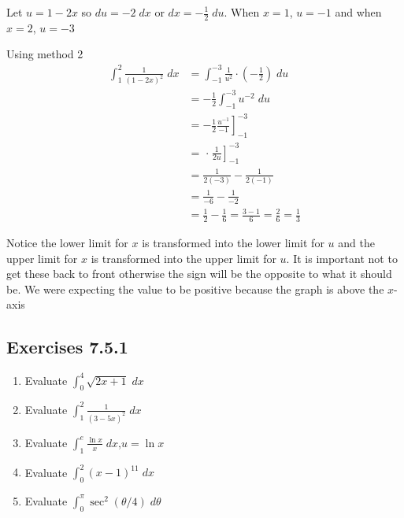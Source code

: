 Let $u =1 -2 x$ so $d u = -2\; d x$ or $d x = -\frac{1}{2}\; d u$. When $x =1$, $u = -1$ and when $x =2$, $u = -3$ 

Using method 2
\begin{align*}\int _{1}^{2}\frac{1}{\left (1 -2 x\right )^{2}}\; d x &  = \int _{ -1}^{ -3}\frac{1}{u^{2}} \cdot \left ( -\frac{1}{2}\right )\; d u \\
 &  =  -\frac{1}{2} \int _{ -1}^{ -3}u^{ -2}\; d u \\
 &  = \left . -\frac{1}{2} \frac{u^{ -1}}{ -1}\right ]_{ -1}^{ -3} \\
 &  = \genfrac{.}{]}{}{}{1}{2 u}_{ -1}^{ -3} \\
 &  = \frac{1}{2 \left ( -3\right )} -\frac{1}{2 \left ( -1\right )} \\
 &  = \frac{1}{ -6} -\frac{1}{ -2} \\
 &  = \frac{1}{2} -\frac{1}{6} =\frac{3 -1}{6} =\frac{2}{6} =\frac{1}{3}\end{align*}

Notice the lower limit for $x$ is transformed into the lower limit for $u$ and the upper limit for $x$ is transformed into the upper limit for $u$. It is important not to get these back to front otherwise the sign will be the opposite
to what it should be. We were expecting the value to be positive because the graph is above the $x$-axis 

\subsection{Exercises 7.5.1}
\begin{enumerate}
\item Evaluate $\int _{0}^{4}\sqrt{2 x +1}\; d x$ 

\item Evaluate $\int _{1}^{2}\frac{1}{\left (3 -5 x\right )^{2}}\; d x$ 

\item Evaluate $\int _{1}^{e}\frac{\ln  x}{x}\; d x$,\qquad $u =\ln  x$ 

\item Evaluate $\int _{0}^{2}\left (x -1\right )^{11}\; d x$ 

\item Evaluate $\int _{0}^{\pi }\sec ^{2} \left (\theta /4\right )\; d \theta $ \end{enumerate}



